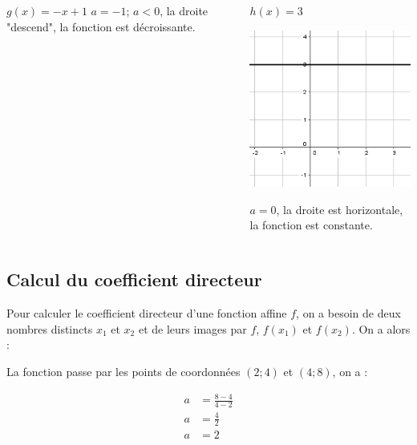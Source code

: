 \documentclass[xcolor={dvipsnames}]{beamer}
\begin{document}
\begin{frame}
\begin{columns}[c]
\begin{column}{3.7cm}
\begin{exampleblock}{$g(x)=-x+1$}
				$a=-1$; $a<0$, la droite "descend", la fonction est décroissante. 
			\end{exampleblock}
		\end{column}
		
		\begin{column}{3.7cm}
			\begin{exampleblock}{$h(x)=3$}
			
				\begin{center}
					\includegraphics[scale=0.45]{ex2_3}
				\end{center}		
				$a=0$, la droite est horizontale, la fonction est constante. 
			\end{exampleblock}
		\end{column}
	
	\end{columns}



\end{frame}

\subsection{Calcul du coefficient directeur}


\begin{frame}
	\begin{mymeth}
		Pour calculer le coefficient directeur d'une fonction affine $f$, on a besoin de deux nombres distincts $x_1$ et $x_2$ et de leurs images par $f$, $f(x_1)$ et $f(x_2)$. On a alors :

	\end{mymeth}
\end{frame}	

\begin{frame}
	\begin{myex}
		La fonction passe par les points de coordonnées $(2;4)$ et $(4;8)$, on a :
		
		\begin{align*}
		a &= \frac{8-4}{4-2} \\
		a &= \frac{4}{2} \\
		a &= 2
		\end{align*}
	\end{myex}
	
\end{frame}
\end{document}
